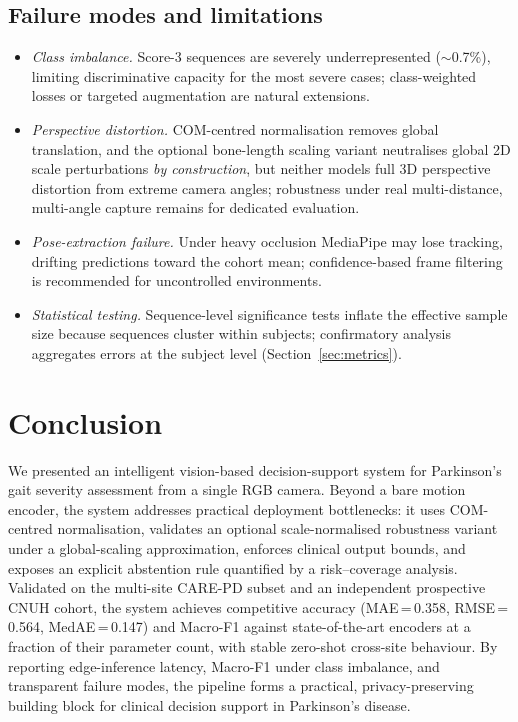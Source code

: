 \documentclass[preprint,12pt]{elsarticle}
\begin{document}
\subsection{Failure modes and limitations}
\label{sec:failure}
\begin{itemize}
    \item \emph{Class imbalance.} Score-3 sequences are severely
    underrepresented ($\sim$0.7\%), limiting discriminative capacity for the most
    severe cases; class-weighted losses or targeted augmentation are natural
    extensions.
    \item \emph{Perspective distortion.} COM-centred normalisation removes
    global translation, and the optional bone-length scaling variant neutralises
    global 2D scale perturbations \emph{by construction}, but neither models
    full 3D perspective distortion from extreme camera angles; robustness under
    real multi-distance, multi-angle capture remains for dedicated evaluation.
    \item \emph{Pose-extraction failure.} Under heavy occlusion MediaPipe may lose
    tracking, drifting predictions toward the cohort mean; confidence-based frame
    filtering is recommended for uncontrolled environments.
    \item \emph{Statistical testing.} Sequence-level significance tests inflate
    the effective sample size because sequences cluster within subjects;
    confirmatory analysis aggregates errors at the subject level
    (Section~\ref{sec:metrics}).
\end{itemize}

\section{Conclusion}
\label{sec:conclusion}
We presented an intelligent vision-based decision-support system for Parkinson's
gait severity assessment from a single RGB camera. Beyond a bare motion encoder,
the system addresses practical deployment bottlenecks: it uses COM-centred
normalisation, validates an optional scale-normalised robustness variant under a
global-scaling approximation, enforces clinical output bounds, and exposes an
explicit abstention rule quantified by a risk--coverage analysis. Validated on the
multi-site CARE-PD subset and an independent prospective CNUH cohort, the system
achieves competitive accuracy (MAE\,=\,0.358, RMSE\,=\,0.564,
MedAE\,=\,0.147) and Macro-F1 against
state-of-the-art encoders at a fraction of their parameter count, with stable
zero-shot cross-site behaviour. By reporting edge-inference latency, Macro-F1
under class imbalance, and transparent failure modes, the pipeline forms a
practical, privacy-preserving building block for clinical decision support in
Parkinson's disease.
\end{document}
